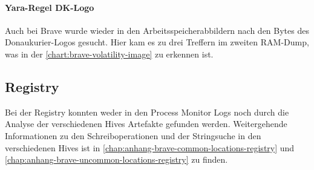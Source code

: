 \paragraph{Yara-Regel \glqq{}DK-Logo\grqq{}}\label{chap:ergebnisse-brave-uncommon-locations-volatility-dklogo} 

Auch bei Brave wurde wieder in den Arbeitsspeicherabbildern nach den Bytes des Donaukurier-Logos gesucht. Hier kam es zu drei Treffern im zweiten RAM-Dump, was in der \autoref{chart:brave-volatility-image} zu erkennen ist.

\begin{table}[h!]
	\caption{Anzahl gefundener Hexadezimalwerte des Donaukurier-Logos im Brave RAM}
	\label{chart:brave-volatility-image}
\end{table}

\subsection*{Registry}\label{chap:ergebnisse-brave-uncommon-locations-registry} 

Bei der Registry konnten weder in den Process Monitor Logs noch durch die Analyse der verschiedenen Hives Artefakte gefunden werden. Weitergehende Informationen zu den Schreiboperationen und der Stringsuche in den verschiedenen Hives ist in \autoref{chap:anhang-brave-common-locations-registry} und \autoref{chap:anhang-brave-uncommon-locations-registry} zu finden.


